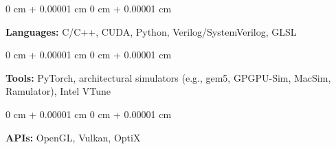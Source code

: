 \documentclass[10pt, letterpaper]{article}
\newenvironment{onecolentry}{
  \begin{adjustwidth}{
    0 cm + 0.00001 cm
  }{
    0 cm + 0.00001 cm
  }
}{
  \end{adjustwidth}
} %
\begin{document}
    \begin{onecolentry}
      \textbf{Languages:} C/C++, CUDA, Python, Verilog/SystemVerilog, GLSL
    \end{onecolentry}
    \vspace{0.2 cm}
    \begin{onecolentry}
      \textbf{Tools:} PyTorch, architectural simulators (e.g., gem5, GPGPU-Sim, MacSim, Ramulator), Intel VTune
    \end{onecolentry}
    \vspace{0.2 cm}
    \begin{onecolentry}
      \textbf{APIs:} OpenGL, Vulkan, OptiX
    \end{onecolentry}
\end{document}
